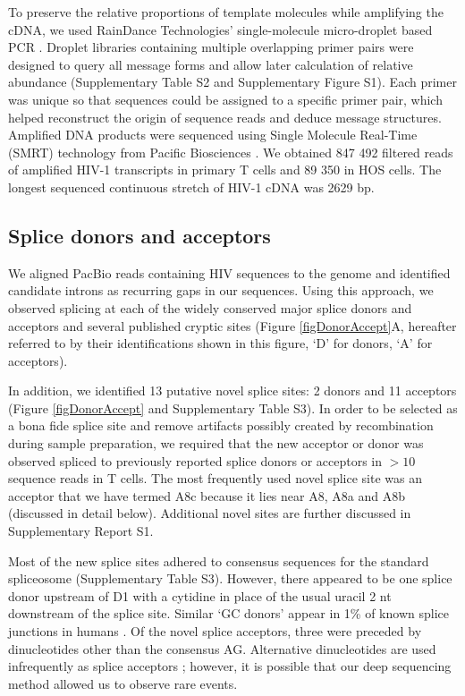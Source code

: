 \documentclass[../sherrill-Mix_thesis.tex]{subfiles}
\begin{document}
To preserve the relative proportions of template molecules while amplifying the cDNA, we used RainDance Technologies' single-molecule micro-droplet based PCR \citep{Tewhey2009}. Droplet libraries containing multiple overlapping primer pairs were designed to query all message forms and allow later calculation of relative abundance (Supplementary Table S2 and Supplementary Figure S1). Each primer was unique so that sequences could be assigned to a specific primer pair, which helped reconstruct the origin of sequence reads and deduce message structures. Amplified DNA products were sequenced using Single Molecule Real-Time (SMRT) technology from Pacific Biosciences \citep{Eid2009,Travers2010}. We obtained 847 492 filtered reads of amplified HIV-1 transcripts in primary \cdFour{} T cells and 89 350 in HOS cells. The longest sequenced continuous stretch of HIV-1 cDNA was 2629 bp. 


\subsection{Splice donors and acceptors}
We aligned PacBio reads containing HIV sequences to the \hivEight{} genome and identified candidate introns as recurring gaps in our sequences. Using this approach, we observed splicing at each of the widely conserved major splice donors and acceptors and several published cryptic sites (Figure \ref{figDonorAccept}A, hereafter referred to by their identifications shown in this figure, `D' for donors, `A' for acceptors).

In addition, we identified 13 putative novel splice sites: 2 donors and 11 acceptors (Figure \ref{figDonorAccept} and Supplementary Table S3). In order to be selected as a bona fide splice site and remove artifacts possibly created by recombination during sample preparation, we required that the new acceptor or donor was observed spliced to previously reported splice donors or acceptors in $>10$ sequence reads in \cdFour{} T cells. The most frequently used novel splice site was an acceptor that we have termed A8c because it lies near A8, A8a and A8b (discussed in detail below). Additional novel sites are further discussed in Supplementary Report S1.

Most of the new splice sites adhered to consensus sequences for the standard spliceosome (Supplementary Table S3). However, there appeared to be one splice donor upstream of D1 with a cytidine in place of the usual uracil 2 nt downstream of the splice site. Similar `GC donors' appear in 1\% of known splice junctions in humans \citep{Thanaraj2001}. Of the novel splice acceptors, three were preceded by dinucleotides other than the consensus AG. Alternative dinucleotides are used infrequently as splice acceptors \citep{Aebi1986,Burset2000,Burset2001,Sheth2006}; however, it is possible that our deep sequencing method allowed us to observe rare events. 
\end{document}
